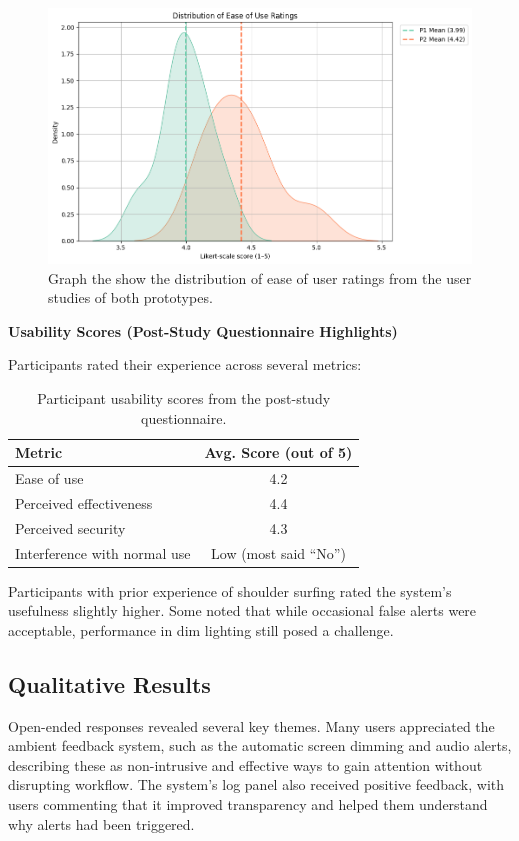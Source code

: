 \documentclass[12pt]{article}
\theoremstyle{plain}
\theoremstyle{definition}
\begin{document}
\begin{figure}
    \centering
    \includegraphics[width=1.0\linewidth]{img/ttest.png}
    \caption{Graph the show the distribution of ease of user ratings from the user studies of both prototypes.}
    \label{fig:t-test}
\end{figure}

\textbf{Usability Scores (Post-Study Questionnaire Highlights)}

Participants rated their experience across several metrics:
\begin{table}[h!]
\centering
\begin{tabular}{|l|c|}
\hline
\textbf{Metric} & \textbf{Avg. Score (out of 5)} \\
\hline
Ease of use & 4.2 \\
Perceived effectiveness & 4.4 \\
Perceived security & 4.3 \\
Interference with normal use & Low (most said “No”) \\
\hline
\end{tabular}
\caption{Participant usability scores from the post-study questionnaire.}
\label{tab:usability_scores}
\end{table}

Participants with prior experience of shoulder surfing rated the system’s usefulness slightly higher. Some noted that while occasional false alerts were acceptable, performance in dim lighting still posed a challenge.

\subsection{Qualitative Results}

Open-ended responses revealed several key themes. Many users appreciated the ambient feedback system, such as the automatic screen dimming and audio alerts, describing these as non-intrusive and effective ways to gain attention without disrupting workflow. The system’s log panel also received positive feedback, with users commenting that it improved transparency and helped them understand why alerts had been triggered.
\end{document}
